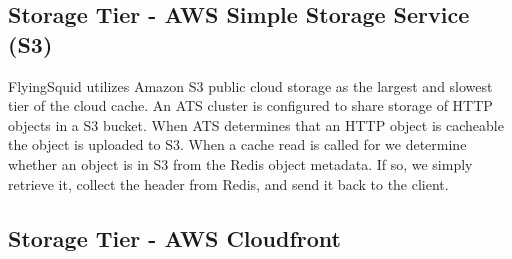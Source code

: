 \subsection{Storage Tier - AWS Simple Storage Service (S3)}
FlyingSquid utilizes Amazon S3 public cloud storage as the largest and slowest tier of the cloud cache. An ATS cluster is configured to share storage of HTTP objects in a S3 bucket. When ATS determines that an HTTP object is cacheable the object is uploaded to S3. When a cache read is called for we determine whether an object is in S3 from the Redis object metadata. If so, we simply retrieve it, collect the header from Redis, and send it back to the client.

\subsection{Storage Tier - AWS Cloudfront}

